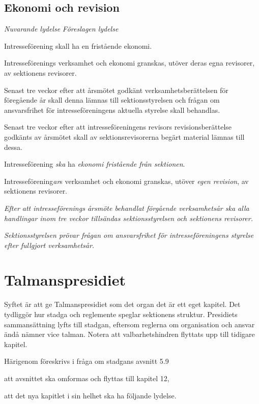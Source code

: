 \documentclass{article}
\newenvironment{lydelse}
    {\begin{paracol}{2}%
        \emph{Nuvarande lydelse}%
        \switchcolumn%
        \emph{Föreslagen lydelse}%
    \end{paracol}%
    \begin{enumerate}[label=\thesubsection.\arabic*]%
    \begin{paracol}{2}%
    }{\end{paracol}\end{enumerate}}
\begin{document}
\subsection{Ekonomi och revision}
\begin{lydelse}
  \setcounter{section}{12}
  \setcounter{subsection}{6}
  \item Intresseförening skall ha en fristående ekonomi.
  \item Intresseförenings verksamhet och ekonomi granskas, utöver deras egna revisorer, av sektionens revisorer.
  \item Senast tre veckor efter att årsmötet godkänt verksamhetsberättelsen för föregående år skall denna lämnas till sektionsstyrelsen och frågan om ansvarsfrihet för intresseföreningens aktuella styrelse skall behandlas.
  \item Senast tre veckor efter att intresseföreningens revisors revisionsberättelse godkänts av årsmötet skall av sektionsrevisorerna begärt material lämnas till dessa.
\switchcolumn
  \setcounter{section}{11}
  \item Intresseförening \emph{ska} ha \emph{ekonomi fristående från sektionen}.
  \item Intresseförening\emph{ar}s verksamhet och ekonomi granskas, utöver \emph{egen revision}, av sektionens revisorer.
  \item \emph{Efter att intresseförenings årsmöte behandlat förgående verksamhetsår ska alla handlingar inom tre veckor tillsändas sektionsstyrelsen och sektionens revisorer.}
  \item \emph{Sektionsstyrelsen prövar frågan om ansvarsfrihet för intresseföreningens styrelse efter fullgjort verksamhetsår.}
\end{lydelse}
\setcounter{section}{11}
\setcounter{subsection}{2}

\section{Talmanspresidiet}
Syftet är att ge Talmanspresidiet som det organ det är ett eget kapitel.
Det tydliggör hur stadga och reglemente speglar sektionens struktur.
Presidiets sammansättning lyfts till stadgan, eftersom reglerna om organisation och ansvar ändå nämner vice talman.
Notera att valbarhetshindren flyttats upp till tidigare kapitel.

Härigenom föreskrivs i fråga om stadgans avsnitt 5.9
\begin{dels}
  \item att avsnittet ska omformas och flyttas till kapitel 12,
  \item att det nya kapitlet i sin helhet ska ha följande lydelse.
\end{dels}
\end{document}
